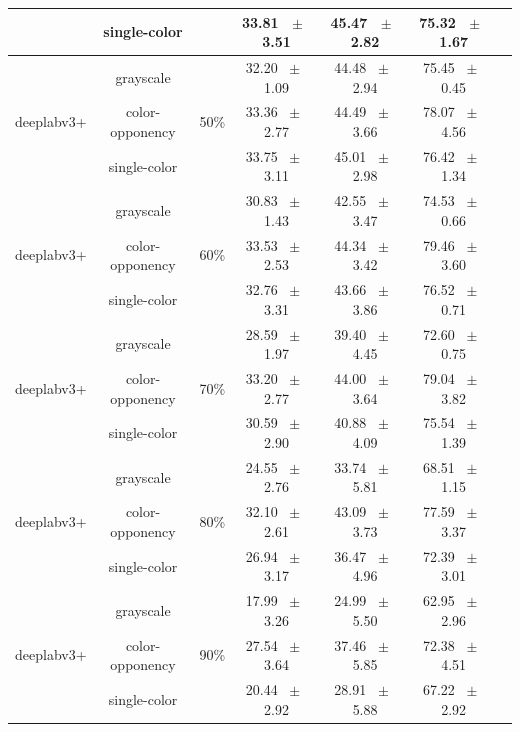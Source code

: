 \begin{table}[h]
\begin{tabular}{@{}lccc ccc@{}}
    & single-color &  & 33.81 ~$\pm$~ 3.51 & 45.47 ~$\pm$~ 2.82 & 75.32 ~$\pm$~ 1.67 \\
    \midrule
    \multirow{3}{*}{deeplabv3+} & grayscale & \multirow{3}{*}{50\%} & 32.20 ~$\pm$~ 1.09 & 44.48 ~$\pm$~ 2.94 & 75.45 ~$\pm$~ 0.45 \\
    & color-opponency &  & 33.36 ~$\pm$~ 2.77 & 44.49 ~$\pm$~ 3.66 & 78.07 ~$\pm$~ 4.56 \\
    & single-color &  & 33.75 ~$\pm$~ 3.11 & 45.01 ~$\pm$~ 2.98 & 76.42 ~$\pm$~ 1.34 \\
    \midrule
    \multirow{3}{*}{deeplabv3+} & grayscale & \multirow{3}{*}{60\%} & 30.83 ~$\pm$~ 1.43 & 42.55 ~$\pm$~ 3.47 & 74.53 ~$\pm$~ 0.66 \\
    & color-opponency &  & 33.53 ~$\pm$~ 2.53 & 44.34 ~$\pm$~ 3.42 & 79.46 ~$\pm$~ 3.60 \\
    & single-color &  & 32.76 ~$\pm$~ 3.31 & 43.66 ~$\pm$~ 3.86 & 76.52 ~$\pm$~ 0.71 \\
    \midrule
    \multirow{3}{*}{deeplabv3+} & grayscale & \multirow{3}{*}{70\%} & 28.59 ~$\pm$~ 1.97 & 39.40 ~$\pm$~ 4.45 & 72.60 ~$\pm$~ 0.75 \\
    & color-opponency &  & 33.20 ~$\pm$~ 2.77 & 44.00 ~$\pm$~ 3.64 & 79.04 ~$\pm$~ 3.82 \\
    & single-color &  & 30.59 ~$\pm$~ 2.90 & 40.88 ~$\pm$~ 4.09 & 75.54 ~$\pm$~ 1.39 \\
    \midrule
    \multirow{3}{*}{deeplabv3+} & grayscale & \multirow{3}{*}{80\%} & 24.55 ~$\pm$~ 2.76 & 33.74 ~$\pm$~ 5.81 & 68.51 ~$\pm$~ 1.15 \\
    & color-opponency &  & 32.10 ~$\pm$~ 2.61 & 43.09 ~$\pm$~ 3.73 & 77.59 ~$\pm$~ 3.37 \\
    & single-color &  & 26.94 ~$\pm$~ 3.17 & 36.47 ~$\pm$~ 4.96 & 72.39 ~$\pm$~ 3.01 \\
    \midrule
    \multirow{3}{*}{deeplabv3+} & grayscale & \multirow{3}{*}{90\%} & 17.99 ~$\pm$~ 3.26 & 24.99 ~$\pm$~ 5.50 & 62.95 ~$\pm$~ 2.96 \\
    & color-opponency &  & 27.54 ~$\pm$~ 3.64 & 37.46 ~$\pm$~ 5.85 & 72.38 ~$\pm$~ 4.51 \\
    & single-color &  & 20.44 ~$\pm$~ 2.92 & 28.91 ~$\pm$~ 5.88 & 67.22 ~$\pm$~ 2.92 \\
    \midrule
    \bottomrule
  \end{tabular}
  \label{tab:sparse_results_deeplabv3+_acdc_snow}
\end{table}
